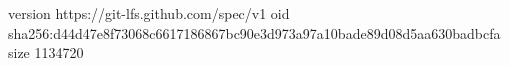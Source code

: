 version https://git-lfs.github.com/spec/v1
oid sha256:d44d47e8f73068c6617186867bc90e3d973a97a10bade89d08d5aa630badbcfa
size 1134720
